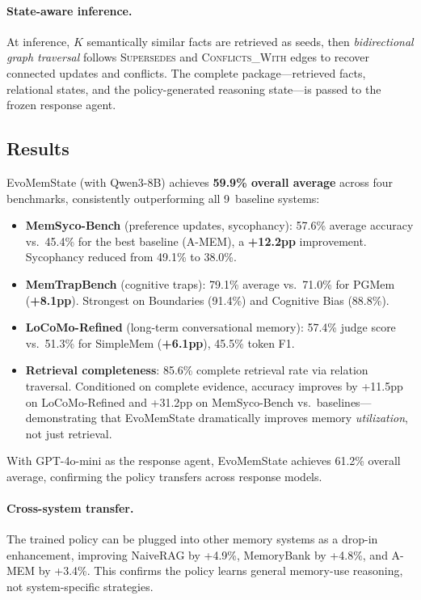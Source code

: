 \documentclass[11pt,a4paper]{article}
\begin{document}
\paragraph{State-aware inference.}
At inference, $K$ semantically similar facts are retrieved as seeds, then \emph{bidirectional graph traversal} follows \textsc{Supersedes} and \textsc{Conflicts\_With} edges to recover connected updates and conflicts. The complete package---retrieved facts, relational states, and the policy-generated reasoning state---is passed to the frozen response agent.

\subsection{Results}
EvoMemState (with Qwen3-8B) achieves \textbf{59.9\% overall average} across four benchmarks, consistently outperforming all 9~baseline systems:

\begin{itemize}
  \item \textbf{MemSyco-Bench} (preference updates, sycophancy): 57.6\% average accuracy vs.\ 45.4\% for the best baseline (A-MEM), a \textbf{+12.2pp} improvement. Sycophancy reduced from 49.1\% to 38.0\%.
  \item \textbf{MemTrapBench} (cognitive traps): 79.1\% average vs.\ 71.0\% for PGMem (\textbf{+8.1pp}). Strongest on Boundaries (91.4\%) and Cognitive Bias (88.8\%).
  \item \textbf{LoCoMo-Refined} (long-term conversational memory): 57.4\% judge score vs.\ 51.3\% for SimpleMem (\textbf{+6.1pp}), 45.5\% token F1.
  \item \textbf{Retrieval completeness}: 85.6\% complete retrieval rate via relation traversal. Conditioned on complete evidence, accuracy improves by +11.5pp on LoCoMo-Refined and +31.2pp on MemSyco-Bench vs.\ baselines---demonstrating that EvoMemState dramatically improves memory \emph{utilization}, not just retrieval.
\end{itemize}

With GPT-4o-mini as the response agent, EvoMemState achieves 61.2\% overall average, confirming the policy transfers across response models.

\paragraph{Cross-system transfer.}
The trained policy can be plugged into other memory systems as a drop-in enhancement, improving NaiveRAG by +4.9\%, MemoryBank by +4.8\%, and A-MEM by +3.4\%. This confirms the policy learns general memory-use reasoning, not system-specific strategies.
\end{document}
